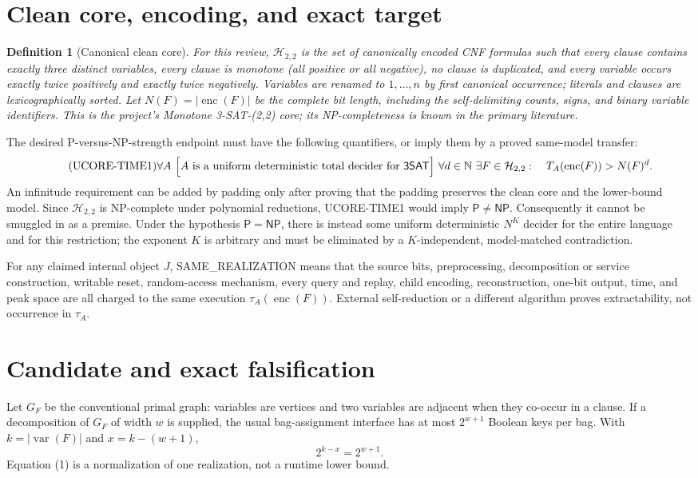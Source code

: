 \documentclass[11pt]{article}
\newtheorem{definition}{Definition}
\newcommand{\SAT}{\mathsf{3SAT}}
\newcommand{\enc}{\operatorname{enc}}
\begin{document}
\section{Clean core, encoding, and exact target}
\begin{definition}[Canonical clean core]
For this review, $\mathcal H_{2,2}$ is the set of canonically encoded CNF
formulas such that every clause contains exactly three distinct variables,
every clause is monotone (all positive or all negative), no clause is
duplicated, and every variable occurs exactly twice positively and exactly
twice negatively.  Variables are renamed to $1,\ldots,n$ by first canonical
occurrence; literals and clauses are lexicographically sorted.  Let
$N(F)=|\enc(F)|$ be the complete bit length, including the self-delimiting
counts, signs, and binary variable identifiers.  This is the project's
Monotone 3-SAT-(2,2) core; its NP-completeness is known in the primary
literature.
\end{definition}

The desired P-versus-NP-strength endpoint must have the following quantifiers,
or imply them by a proved same-model transfer:
\[
 \tag{UCORE-TIME1}
 \forall A\ \Bigl[A\text{ is a uniform deterministic total decider for }
 \SAT\Bigr]
 \ \forall d\in\mathbb N\ \exists F\in\mathcal H_{2,2}:\quad
 T_A(\enc(F))>N(F)^d.
\]
An infinitude requirement can be added by padding only after proving that the
padding preserves the clean core and the lower-bound model.  Since
$\mathcal H_{2,2}$ is NP-complete under polynomial reductions,
UCORE-TIME1 would imply $\mathsf P\ne\mathsf{NP}$.  Consequently it cannot be
smuggled in as a premise.  Under the hypothesis $\mathsf P=\mathsf{NP}$,
there is instead some uniform deterministic $N^K$ decider for the entire
language and for this restriction; the exponent $K$ is arbitrary and must be
eliminated by a $K$-independent, model-matched contradiction.

For any claimed internal object $J$, SAME\_REALIZATION means that the source
bits, preprocessing, decomposition or service construction, writable reset,
random-access mechanism, every query and replay, child encoding,
reconstruction, one-bit output, time, and peak space are all charged to the
same execution $\tau_A(\enc(F))$.  External self-reduction or a different
algorithm proves extractability, not occurrence in $\tau_A$.

\section{Candidate and exact falsification}
Let $G_F$ be the conventional primal graph: variables are vertices and two
variables are adjacent when they co-occur in a clause.  If a decomposition of
$G_F$ of width $w$ is supplied, the usual bag-assignment interface has at most
$2^{w+1}$ Boolean keys per bag.  With $k=|\operatorname{var}(F)|$ and
$x=k-(w+1)$,
\[
             2^{k-x}=2^{w+1}.                                           \tag{1}
\]
Equation (1) is a normalization of one realization, not a runtime lower bound.
\end{document}
